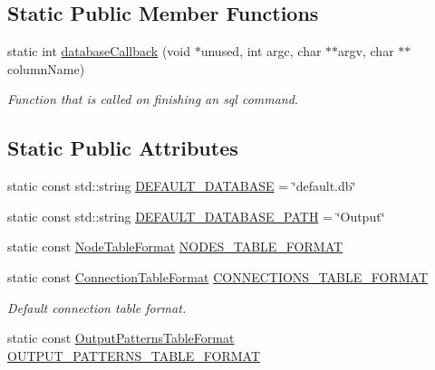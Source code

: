 \subsection*{\-Static \-Public \-Member \-Functions}
\begin{DoxyCompactItemize}
\item 
static int \hyperlink{classcryomesh_1_1manager_1_1DatabaseManager_a3cde0d12f3b2a4ae1e48cd07089920be}{database\-Callback} (void $\ast$unused, int argc, char $\ast$$\ast$argv, char $\ast$$\ast$column\-Name)
\begin{DoxyCompactList}\small\item\em \-Function that is called on finishing an sql command. \end{DoxyCompactList}\end{DoxyCompactItemize}
\subsection*{\-Static \-Public \-Attributes}
\begin{DoxyCompactItemize}
\item 
static const std\-::string \hyperlink{classcryomesh_1_1manager_1_1DatabaseManager_a83c6bbd218ba8c1b5e7391e60b933fe9}{\-D\-E\-F\-A\-U\-L\-T\-\_\-\-D\-A\-T\-A\-B\-A\-S\-E} = \char`\"{}default.\-db\char`\"{}
\item 
static const std\-::string \hyperlink{classcryomesh_1_1manager_1_1DatabaseManager_add36833b81e7d10423c902929484c70c}{\-D\-E\-F\-A\-U\-L\-T\-\_\-\-D\-A\-T\-A\-B\-A\-S\-E\-\_\-\-P\-A\-T\-H} = \char`\"{}\-Output\char`\"{}
\item 
static const \hyperlink{structcryomesh_1_1manager_1_1NodeTableFormat}{\-Node\-Table\-Format} \hyperlink{classcryomesh_1_1manager_1_1DatabaseManager_a012235d36d2c11662d1714723d70beb2}{\-N\-O\-D\-E\-S\-\_\-\-T\-A\-B\-L\-E\-\_\-\-F\-O\-R\-M\-A\-T}
\item 
static const \hyperlink{structcryomesh_1_1manager_1_1ConnectionTableFormat}{\-Connection\-Table\-Format} \hyperlink{classcryomesh_1_1manager_1_1DatabaseManager_ad318d1adc10df5e9ad8a55252b627456}{\-C\-O\-N\-N\-E\-C\-T\-I\-O\-N\-S\-\_\-\-T\-A\-B\-L\-E\-\_\-\-F\-O\-R\-M\-A\-T}
\begin{DoxyCompactList}\small\item\em \-Default connection table format. \end{DoxyCompactList}\item 
static const \*
\hyperlink{structcryomesh_1_1manager_1_1OutputPatternsTableFormat}{\-Output\-Patterns\-Table\-Format} \hyperlink{classcryomesh_1_1manager_1_1DatabaseManager_a4e48c5624fa72f404f104c079e961b74}{\-O\-U\-T\-P\-U\-T\-\_\-\-P\-A\-T\-T\-E\-R\-N\-S\-\_\-\-T\-A\-B\-L\-E\-\_\-\-F\-O\-R\-M\-A\-T}
\end{DoxyCompactItemize}
